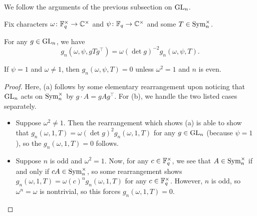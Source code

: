 We follow the arguments of the previous subsection on $\mathrm{GL}_n$.
\begin{lemma} \label{lem:gsum-sym-basic}
    Fix characters $\omega\colon\mathbb F_q^\times\to\mathbb C^\times$ and $\psi\colon\mathbb F_q\to\mathbb C^\times$ and some $T\in\operatorname{Sym}_n^\times$.
    \begin{listalph}
        \item For any $g\in\mathrm{GL}_n$, we have
        \[g_n(\omega,\psi,gTg^\intercal)=\omega(\det g)^{-2}g_n(\omega,\psi,T).\]
        \item If $\psi=1$ and $\omega\ne1$, then $g_n(\omega,\psi,T)=0$ unless $\omega^2=1$ and $n$ is even.
    \end{listalph}
\end{lemma}
\begin{proof}
    Here, (a) follows by some elementary rearrangement upon noticing that $\operatorname{GL}_n$ acts on $\operatorname{Sym}_n^\times$ by $g\cdot A=gAg^\intercal$. For (b), we handle the two listed cases separately.
    \begin{itemize}
        \item Suppose $\omega^2\ne1$. Then the rearrangement which shows (a) is able to show that $g_n(\omega,1,T)=\omega(\det g)^2g_n(\omega,1,T)$ for any $g\in\mathrm{GL}_n$ (because $\psi=1$), so the $g_n(\omega,1,T)=0$ follows.
        \item Suppose $n$ is odd and $\omega^2=1$. Now, for any $c\in\mathbb F_q^\times$, we see that $A\in\operatorname{Sym}_n^\times$ if and only if $cA\in\operatorname{Sym}_n^\times$, so some rearrangement shows $g_n(\omega,1,T)=\omega(c)^ng_n(\omega,1,T)$ for any $c\in\mathbb F_q^\times$. However, $n$ is odd, so $\omega^n=\omega$ is nontrivial, so this forces $g_n(\omega,1,T)=0$.

\end{itemize}
\end{proof}
